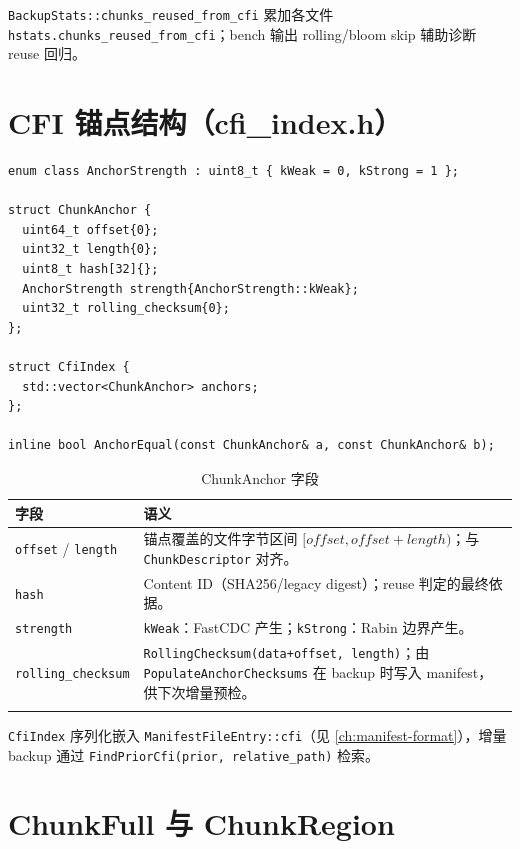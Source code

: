 \texttt{BackupStats::chunks\_reused\_from\_cfi} 累加各文件 \texttt{hstats.chunks\_reused\_from\_cfi}；bench 输出 rolling/bloom skip 辅助诊断 reuse 回归。

\section{CFI 锚点结构（cfi\_index.h）}
\label{sec:cfi-index}

\begin{lstlisting}[caption={ChunkAnchor 与 CfiIndex（\filepath{cfi\_index.h}）},label={lst:cfi-index-h}]
enum class AnchorStrength : uint8_t { kWeak = 0, kStrong = 1 };

struct ChunkAnchor {
  uint64_t offset{0};
  uint32_t length{0};
  uint8_t hash[32]{};
  AnchorStrength strength{AnchorStrength::kWeak};
  uint32_t rolling_checksum{0};
};

struct CfiIndex {
  std::vector<ChunkAnchor> anchors;
};

inline bool AnchorEqual(const ChunkAnchor& a, const ChunkAnchor& b);
\end{lstlisting}

\begin{longtable}{@{}p{3.2cm}p{10.8cm}@{}}
\toprule
\textbf{字段} & \textbf{语义} \\
\midrule
\endhead
\texttt{offset} / \texttt{length} &
  锚点覆盖的文件字节区间 $[offset, offset+length)$；与 \texttt{ChunkDescriptor} 对齐。 \\
\texttt{hash} &
  Content ID（SHA256/legacy digest）；reuse 判定的最终依据。 \\
\texttt{strength} &
  \texttt{kWeak}：FastCDC 产生；\texttt{kStrong}：Rabin 边界产生。 \\
\texttt{rolling\_checksum} &
  \texttt{RollingChecksum(data+offset, length)}；由 \texttt{PopulateAnchorChecksums} 在 backup 时写入 manifest，供下次增量预检。 \\
\bottomrule
\caption{ChunkAnchor 字段}
\label{tab:chunk-anchor}
\end{longtable}

\texttt{CfiIndex} 序列化嵌入 \texttt{ManifestFileEntry::cfi}（见 \cref{ch:manifest-format}），增量 backup 通过 \texttt{FindPriorCfi(prior, relative\_path)} 检索。

\section{ChunkFull 与 ChunkRegion}
\label{sec:hcrbo-chunk-full-region}

